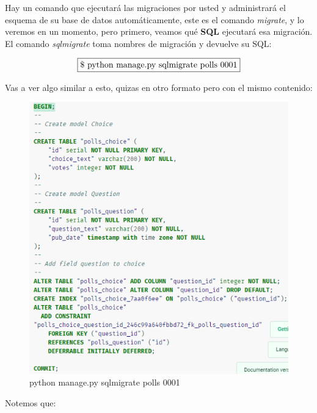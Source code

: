 \documentclass[10pt]{article}
\begin{document}
Hay un comando que ejecutará las migraciones por usted y administrará el esquema de su base de datos automáticamente, este es el comando \textit{migrate}, y lo veremos en un momento, pero primero, veamos qué \textbf{SQL} ejecutará esa migración. El comando \textit{sqlmigrate} toma nombres de migración y devuelve su SQL:

$$\fbox{\$ python manage.py sqlmigrate polls 0001}$$

Vas a ver algo similar a esto, quizas en otro formato pero con el mismo contenido:


\begin{figure}[H]
\begin{center}
\includegraphics[scale=0.7]{figuras/323/img3.png}
\renewcommand{\arraystretch}{1.3}
\caption{python manage.py sqlmigrate polls 0001}
\end{center}
\end{figure}

Notemos que:
\end{document}
